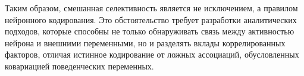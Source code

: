 Таким образом, смешанная селективность является не исключением, а правилом нейронного кодирования. Это обстоятельство требует разработки аналитических подходов, которые способны не только обнаруживать связь между активностью нейрона и внешними переменными, но и разделять вклады коррелированных факторов, отличая истинное кодирование от ложных ассоциаций, обусловленных ковариацией поведенческих переменных.
